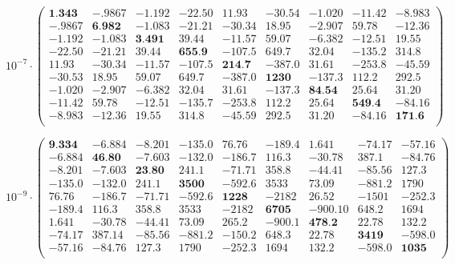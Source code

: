 \documentclass[a4paper,10pt]{thesis}
\begin{document}
\tiny
\begin{equation}\label{cov_1MHz}
10^{-7} \cdot \left(
\begin{array}{ccccccccc}
\textbf{1.343} & -.9867 & -1.192 & -22.50 & 11.93 & -30.54 & -1.020 & -11.42 & -8.983 \\
 -.9867 & \textbf{6.982} & -1.083 & -21.21 & -30.34 & 18.95 & -2.907 & 59.78 & -12.36 \\
 -1.192 & -1.083 & \textbf{3.491} & 39.44 & -11.57 & 59.07 & -6.382 & -12.51 & 19.55 \\
 -22.50 & -21.21 & 39.44 & \textbf{655.9} & -107.5 & 649.7 & 32.04 & -135.2 & 314.8 \\
 11.93 & -30.34 & -11.57 & -107.5 & \textbf{214.7} & -387.0 & 31.61 & -253.8 & -45.59 \\
 -30.53 & 18.95 & 59.07 & 649.7 & -387.0 & \textbf{1230} & -137.3 & 112.2 & 292.5 \\
 -1.020 & -2.907 & -6.382 & 32.04 & 31.61 & -137.3 & \textbf{84.54} & 25.64 & 31.20 \\
 -11.42 & 59.78 & -12.51 & -135.7 & -253.8 & 112.2 & 25.64 & \textbf{549.4} & -84.16 \\
 -8.983 & -12.36 & 19.55 & 314.8 & -45.59 & 292.5 & 31.20 & -84.16 & \textbf{171.6} \\
\end{array}%
\right)
\end{equation}
\normalsize


\tiny
\begin{equation}\label{cov_500kHz_B}
10^{-9}\cdot \left(
\begin{array}{ccccccccc}
 \textbf{9.334} & -6.884 & -8.201 & -135.0 & 76.76 & -189.4 & 1.641 & -74.17 & -57.16 \\
 -6.884& \textbf{46.80} & -7.603 & -132.0 & -186.7 & 116.3 & -30.78 & 387.1 & -84.76 \\
 -8.201 & -7.603 & \textbf{23.80} & 241.1 & -71.71 & 358.8 & -44.41 & -85.56 & 127.3 \\
 -135.0 & -132.0 & 241.1 & \textbf{3500} & -592.6 & 3533 & 73.09 & -881.2 & 1790 \\
 76.76 & -186.7 & -71.71 & -592.6 & \textbf{1228} & -2182 & 26.52 & -1501 & -252.3 \\
 -189.4 & 116.3 & 358.8 & 3533 & -2182 & \textbf{6705} & -900.10 & 648.2 & 1694 \\
 1.641& -30.78 & -44.41 & 73.09 & 265.2 & -900.1 & \textbf{478.2} & 22.78 & 132.2 \\
 -74.17 & 387.14 & -85.56 & -881.2& -150.2 & 648.3 & 22.78 & \textbf{3419} & -598.0 \\
 -57.16 & -84.76 & 127.3& 1790 & -252.3 & 1694 & 132.2 & -598.0 & \textbf{1035} \\
\end{array}%
\right)
\end{equation}
\normalsize
\end{document}
